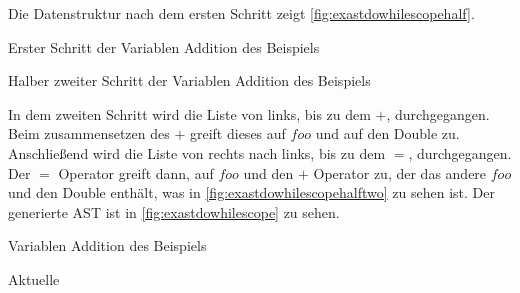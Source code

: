 {{{        Die Datenstruktur nach dem ersten Schritt zeigt \autoref{fig:exastdowhilescopehalf}.
        \begin{paracol}{2}
          \begin{myCodeEnv}
            \centering
            \begin{myInvBox}[width=.9\linewidth]
              
            \end{myInvBox}
            \caption{Erster Schritt der Variablen Addition des Beispiels}
            \label{fig:exastdowhilescopehalf}
          \end{myCodeEnv}
          \switchcolumn
          \begin{myCodeEnv}
            \centering
            \begin{myInvBox}[width=.9\linewidth]
              
            \end{myInvBox}
            \caption{Halber zweiter Schritt der Variablen Addition des Beispiels}
            \label{fig:exastdowhilescopehalftwo}
          \end{myCodeEnv}
        \end{paracol}

        In dem zweiten Schritt wird die Liste von links, bis zu dem \myMIn$+$, durchgegangen. Beim zusammensetzen des \myMIn$+$ greift dieses auf \myMIn$foo$ und auf den Double zu. Anschließend wird die Liste von rechts nach links, bis zu dem \myMIn$=$, durchgegangen. Der \myMIn$=$ Operator greift dann, auf \myMIn$foo$ und den \myMIn$+$ Operator zu, der das andere \myMIn$foo$ und den Double enthält, was in \autoref{fig:exastdowhilescopehalftwo} zu sehen ist. Der generierte AST ist in \autoref{fig:exastdowhilescope} zu sehen.
        \begin{paracol}{2}
          \begin{myCodeEnv}
            \centering
            \begin{myInvBox}[width=.9\linewidth]
              
            \end{myInvBox}
            \caption{Variablen Addition des Beispiels}
            \label{fig:exastdowhilescope}
          \end{myCodeEnv}
          \switchcolumn
          \begin{myCodeEnv}
            \centering
            \begin{myInvBox}[width=.9\linewidth]
              
            \end{myInvBox}
            \caption*{Aktuelle }
          \end{myCodeEnv}
        \end{paracol}

}}}
